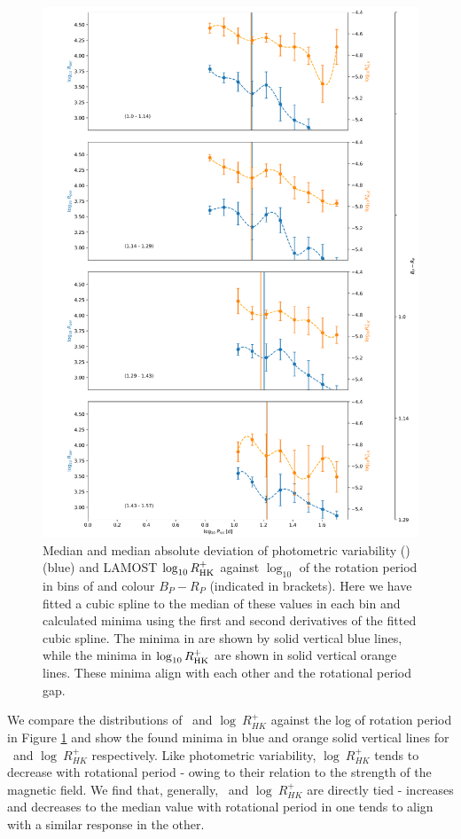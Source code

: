 \begin{figure}
\centering
  \includegraphics[width=\textwidth]{Figures/rot_gap_figures/rot_vs_rper_rhk_minima.png}
  \caption{
  Median and median absolute deviation of photometric variability (\rper{}) (blue) and LAMOST $\log_{10}R^{+}_{\rm{HK}}$ against $\log_{10}$ of the rotation period in bins of and colour \gaia{} $B_P-R_P$ (indicated in brackets). Here we have fitted a cubic spline to the median of these values in each bin and calculated minima using the first and second derivatives of the fitted cubic spline. The minima in \rper{} are shown by solid vertical blue lines, while the minima in $\log_{10}R^{+}_{\rm{HK}}$ are shown in solid vertical orange lines. These minima align with each other and the rotational period gap.}
  \label{fig:rot_rper_rhk}
\end{figure}

We compare the distributions of \rper{} \ and $\log \ R^{+}_{HK}$ against the log of rotation period in Figure \ref{fig:rot_rper_rhk} and show the found minima in blue and orange solid vertical lines for \rper{} \ and $\log \ R^{+}_{HK}$ respectively.
Like photometric variability, $\log \ R^{+}_{HK}$ tends to decrease with rotational period - owing to their relation to the strength of the magnetic field.
We find that, generally, \rper{} \ and $\log \ R^{+}_{HK}$ are directly tied - increases and decreases to the median value with rotational period in one tends to align with a similar response in the other.

